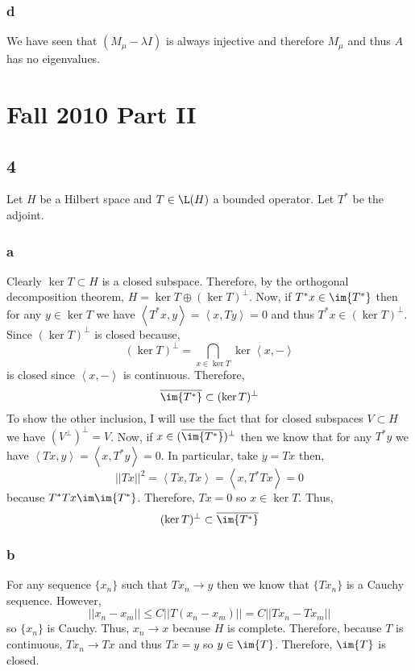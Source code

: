 \documentclass[12pt]{article}
\newcommand{\inner}[2]{\left< #1, #2 \right>}
\begin{document}
\subsubsection{d}

We have seen that $(M_\mu - \lambda I)$ is always injective and therefore $M_\mu$ and thus $A$ has no eigenvalues.


\section{Fall 2010 Part II}

\subsection{4}

Let $H$ be a Hilbert space and $T \in \L(H)$ a bounded operator. Let $T^*$ be the adjoint. 

\subsubsection{a}

Clearly $\ker{T} \subset H$ is a closed subspace. Therefore, by the orthogonal decomposition theorem, $H = \ker{T} \oplus (\ker{T})^\perp$. Now, if $T^* x \in \im{T^*}$ then for any $y \in \ker{T}$ we have $\inner{T^* x}{y} = \inner{x}{T y} = 0$ and thus $T^* x \in (\ker{T})^\perp$. Since $(\ker{T})^\perp$ is closed because,
\[ (\ker{T})^\perp = \bigcap_{x \in \ker{T}} \ker{\inner{x}{-}} \]
is closed since $\inner{x}{-}$ is continuous. Therefore, 
\[ \overline{\im{T^*}} \subset (\ker{T})^\perp \]
To show the other inclusion, I will use the fact that for closed subspaces $V \subset H$ we have $(V^\perp)^\perp = V$. Now, if $x \in (\overline{\im{T^*}})^\perp$ then we know that for any $T^* y$ we have $\inner{T x}{y} = \inner{x}{T^*y} = 0$. In particular, take $y = T x$ then,
\[ || T x ||^2 = \inner{T x}{T x} = \inner{x}{T^* T x} = 0 \]
because $T^* T x \im \im{T^*}$. Therefore, $T x = 0$ so $x \in \ker{T}$. Thus,
\[ (\ker{T})^\perp \subset \overline{\im{T^*}} \]

\subsubsection{b}

For any sequence $\{ x_n \}$ such that $T x_n \to y$ then we know that $\{ T x_n \}$ is a Cauchy sequence. However,
\[ || x_n - x_m || \le C || T (x_n - x_m) || = C || T x_n - T x_m || \]
so $\{ x_n \}$ is Cauchy. Thus, $x_n \to x$ because $H$ is complete. Therefore, because $T$ is continuous, $T x_n \to T x$ and thus $T x = y$ so $y \in \im{T}$. Therefore, $\im{T}$ is closed.
\end{document}
